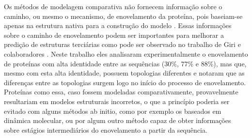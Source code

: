 Os métodos de modelagem comparativa não fornecem informação sobre o caminho, ou mesmo o mecanismo, de enovelamento da proteína, pois baseiam-se apenas na estrutura nativa para a construção do modelo \cite{Helles:2003}. Essas informações sobre o caminho de enovelamento podem ser importantes para melhorar a predição de estruturas terciárias como pode ser observado no trabalho de Giri e colaboradores \cite{Giri:2007}. Neste trabalho eles analisaram experimentalmente o enovelamento de proteínas com alta identidade entre as sequências (30\%, 77\% e 88\%), mas que, mesmo com esta alta identidade, possuem topologias diferentes e notaram que as diferenças entre as topologias surgem logo no início do processo de enovelamento. Proteínas como essa, caso fossem modeladas comparativamente, provavelmente resultariam em modelos estruturais incorretos, o que a princípio poderia ser evitado com alguns métodos ab initio, como por exemplo os baseados em dinâmica molecular, ou por algum outro método capaz de obter informações sobre estágios intermediários do enovelamento a partir da sequência.


